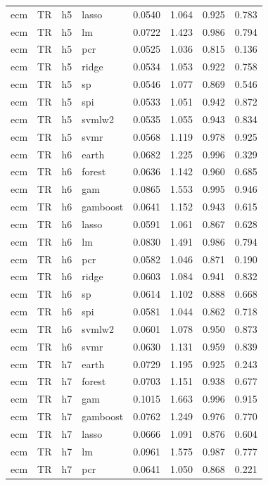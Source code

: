 \begin{ThreePartTable}
\begin{longtable}[t]{llclcccc}
ecm & TR & h5 & lasso & 0.0540 & 1.064 & 0.925 & 0.783\\
ecm & TR & h5 & lm & 0.0722 & 1.423 & 0.986 & 0.794\\
ecm & TR & h5 & pcr & 0.0525 & 1.036 & 0.815 & 0.136\\
ecm & TR & h5 & ridge & 0.0534 & 1.053 & 0.922 & 0.758\\
ecm & TR & h5 & sp & 0.0546 & 1.077 & 0.869 & 0.546\\
ecm & TR & h5 & spi & 0.0533 & 1.051 & 0.942 & 0.872\\
ecm & TR & h5 & svmlw2 & 0.0535 & 1.055 & 0.943 & 0.834\\
ecm & TR & h5 & svmr & 0.0568 & 1.119 & 0.978 & 0.925\\
\addlinespace
ecm & TR & h6 & earth & 0.0682 & 1.225 & 0.996 & 0.329\\
ecm & TR & h6 & forest & 0.0636 & 1.142 & 0.960 & 0.685\\
ecm & TR & h6 & gam & 0.0865 & 1.553 & 0.995 & 0.946\\
ecm & TR & h6 & gamboost & 0.0641 & 1.152 & 0.943 & 0.615\\
ecm & TR & h6 & lasso & 0.0591 & 1.061 & 0.867 & 0.628\\
ecm & TR & h6 & lm & 0.0830 & 1.491 & 0.986 & 0.794\\
ecm & TR & h6 & pcr & 0.0582 & 1.046 & 0.871 & 0.190\\
ecm & TR & h6 & ridge & 0.0603 & 1.084 & 0.941 & 0.832\\
ecm & TR & h6 & sp & 0.0614 & 1.102 & 0.888 & 0.668\\
ecm & TR & h6 & spi & 0.0581 & 1.044 & 0.862 & 0.718\\
ecm & TR & h6 & svmlw2 & 0.0601 & 1.078 & 0.950 & 0.873\\
ecm & TR & h6 & svmr & 0.0630 & 1.131 & 0.959 & 0.839\\
\addlinespace
ecm & TR & h7 & earth & 0.0729 & 1.195 & 0.925 & 0.243\\
ecm & TR & h7 & forest & 0.0703 & 1.151 & 0.938 & 0.677\\
ecm & TR & h7 & gam & 0.1015 & 1.663 & 0.996 & 0.915\\
ecm & TR & h7 & gamboost & 0.0762 & 1.249 & 0.976 & 0.770\\
ecm & TR & h7 & lasso & 0.0666 & 1.091 & 0.876 & 0.604\\
ecm & TR & h7 & lm & 0.0961 & 1.575 & 0.987 & 0.777\\
ecm & TR & h7 & pcr & 0.0641 & 1.050 & 0.868 & 0.221\\

\end{longtable}
\end{ThreePartTable}
